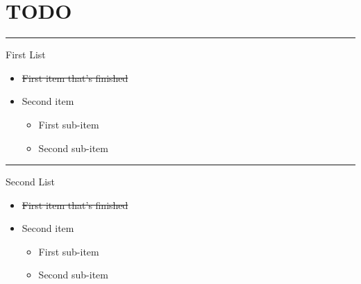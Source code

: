 \documentclass[a4paper, 12pt]{article}
\newcommand{\todoListStart}{
	\begin{itemize}
		\setlength\itemsep{-1mm}
}
\newcommand{\todoListEnd}{
	\end{itemize}
}
\newcommand{\todoSubListStart}{
	\vspace{-3mm}
	\begin{itemize}
	\setlength\itemsep{-1mm}
}
\newcommand{\todoSubListEnd}{
	\end{itemize}
}
\newcommand{\todoListHeader}[1]{
	{\Large #1}
}
\newcommand{\todoListLine}{
	\vspace{2mm}
	\hrule
	\vspace{2mm}
}
\begin{document}
	
	\centering
	
	\section*{TODO}
	
	\todoListLine
	
	\todoListHeader{First List}
	
	\todoListStart
		\item \sout{First item that's finished}
		\item Second item
		\todoSubListStart
			\item First sub-item
			\item Second sub-item
		\todoSubListEnd
	\todoListEnd
	
	\todoListLine
	
	\todoListHeader{Second List}
	
	\todoListStart
		\item \sout{First item that's finished}
		\item Second item
		\todoSubListStart
			\item First sub-item
			\item Second sub-item
		\todoSubListEnd
	\todoListEnd
	
\end{document}
